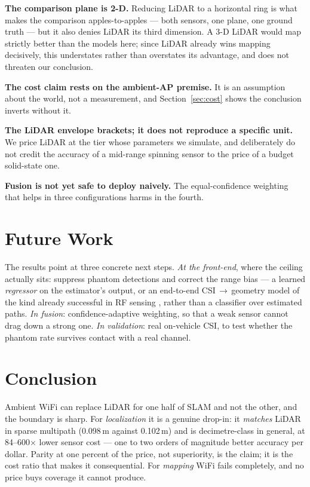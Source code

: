 \documentclass[journal]{IEEEtran}
\newcommand{\SI}[2]{#1\,#2}
\begin{document}
\textbf{The comparison plane is 2-D.} Reducing LiDAR to a horizontal ring is what makes the
comparison apples-to-apples --- both sensors, one plane, one ground truth --- but it also
denies LiDAR its third dimension. A 3-D LiDAR would map strictly better than the models here;
since LiDAR already wins mapping decisively, this understates rather than overstates its
advantage, and does not threaten our conclusion.

\textbf{The cost claim rests on the ambient-AP premise.} It is an assumption about the world,
not a measurement, and Section~\ref{sec:cost} shows the conclusion inverts without it.

\textbf{The LiDAR envelope brackets; it does not reproduce a specific unit.} We price LiDAR at
the tier whose parameters we simulate, and deliberately do not credit the accuracy of a
mid-range spinning sensor to the price of a budget solid-state one.

\textbf{Fusion is not yet safe to deploy naively.} The equal-confidence weighting that helps
in three configurations harms in the fourth.

\section{Future Work}

The results point at three concrete next steps. \emph{At the front-end}, where the ceiling
actually sits: suppress phantom detections and correct the range bias --- a learned
\emph{regressor} on the estimator's output, or an end-to-end CSI\,$\rightarrow$\,geometry
model of the kind already successful in RF sensing \cite{maatta2024csipointcloud}, rather
than a classifier over estimated paths. \emph{In fusion}: confidence-adaptive weighting, so
that a weak sensor cannot drag down a strong one. \emph{In validation}: real on-vehicle CSI,
to test whether the phantom rate survives contact with a real channel.

\section{Conclusion}

Ambient WiFi can replace LiDAR for one half of SLAM and not the other, and the boundary is
sharp. For \emph{localization} it is a genuine drop-in: it \emph{matches} LiDAR in sparse
multipath (\SI{0.098}{m} against \SI{0.102}{m}) and is decimetre-class in general, at
84--600$\times$ lower sensor cost --- one to two orders of magnitude better accuracy per
dollar. Parity at one percent of the price, not superiority, is the claim; it is the cost
ratio that makes it consequential. For \emph{mapping} WiFi fails completely, and no price
buys coverage it cannot produce.
\end{document}
